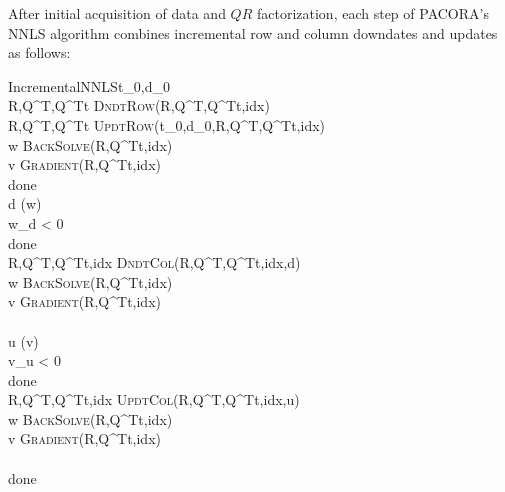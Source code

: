 After initial acquisition of data and $QR$ factorization, each step of PACORA's NNLS algorithm
combines incremental row and column downdates and updates as follows:

\begin{pseudocode}{IncrementalNNLS}{t_0,d_0}
                              \\
R,Q^T,Q^Tt \GETS \textsc{DndtRow}(R,Q^T,Q^Tt,idx)           \\
R,Q^T,Q^Tt \GETS \textsc{UpdtRow}(t_0,d_0,R,Q^T,Q^Tt,idx)     \\
w \GETS \textsc{BackSolve}(R,Q^Tt,idx)                          \\
v \GETS \textsc{Gradient}(R,Q^Tt,idx)                    \\
\REPEAT
  done \GETS \TRUE                                              \\  
  d \GETS \arg\min(w)                                          \\
  \IF w_d < 0 \THEN                                            \\
  \BEGIN
    done \GETS \FALSE                                         \\
    R,Q^T,Q^Tt,idx \GETS \textsc{DndtCol}(R,Q^T,Q^Tt,idx,d)   \\
    w \GETS \textsc{BackSolve}(R,Q^Tt,idx)                    \\
    v \GETS \textsc{Gradient}(R,Q^Tt,idx)              \\
  \END                                                        \\
  u \GETS \arg\min(v)                                         \\
  \IF v_u < 0 \THEN                                           \\
  \BEGIN
    done \GETS \FALSE                                         \\
    R,Q^T,Q^Tt,idx \GETS \textsc{UpdtCol}(R,Q^T,Q^Tt,idx,u)     \\
    w \GETS \textsc{BackSolve}(R,Q^Tt,idx)                    \\
    v \GETS \textsc{Gradient}(R,Q^Tt,idx)              \\
  \END                                                        \\
\UNTIL done                                                   \\ 
                                                  \\     
\end{pseudocode}
 
